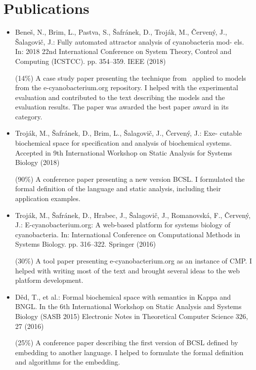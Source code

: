 \documentclass[11pt,a4paper]{report}
\begin{document}
\chapter{Publications}

\begin{itemize}

\item Beneš, N., Brim, L., Pastva, S., Šafránek, D., Troják, M., Červený, J.,
Šalagovič, J.: Fully automated attractor analysis of cyanobacteria mod-
els. In: 2018 22nd International Conference on System Theory, Control
and Computing (ICSTCC). pp. 354--359. IEEE (2018)

(14\%) A case study paper presenting the technique from~\cite{barnat2017detecting} applied to models from the e-cyanobacterium.org repository. I helped with the experimental evaluation and contributed to the text describing the models and the
evaluation results. The paper was awarded the best paper award in its category.

\item Troják, M., Šafránek, D., Brim, L., Šalagovič, J., Červený, J.: Exe-
cutable biochemical space for specification and analysis of biochemical
systems. Accepted in 9th International Workshop on Static Analysis for
Systems Biology (2018)

(90\%) A conference paper presenting a new version BCSL. I formulated the formal definition of the language and static analysis, including their application examples.

\item Troják, M., Šafránek, D., Hrabec, J., Šalagovič, J., Romanovská, F.,
Červený, J.: E-cyanobacterium.org: A web-based platform for systems
biology of cyanobacteria. In: International Conference on Computational
Methods in Systems Biology. pp. 316--322. Springer (2016)

(30\%) A tool paper presenting e-cyanobacterium.org as an instance of CMP. I helped with writing most of the text and brought several ideas to the web platform development.

\item Děd, T., et al.: Formal biochemical space with semantics in Kappa
and BNGL. In the 6th International Workshop on Static Analysis and Systems Biology (SASB 2015) Electronic Notes in Theoretical Computer Science 326, 27
(2016)

(25\%) A conference paper describing the first version of BCSL defined by embedding to another language. I helped to formulate the formal definition and algorithms for the embedding.

\end{itemize}
\end{document}

